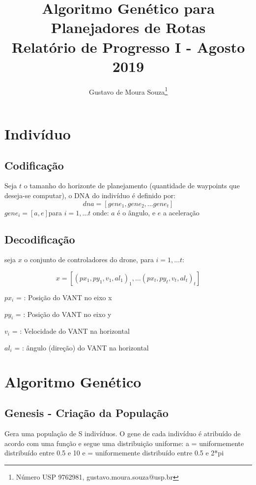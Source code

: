 \documentclass{article}
\begin{document}
\title{Algoritmo Genético para Planejadores de Rotas \\
	\large Relatório de Progresso I - Agosto 2019}
\author{Gustavo de Moura Souza\thanks{Número USP 9762981, gustavo.moura.souza@usp.br}}

\maketitle

\section{Indivíduo}
\subsection{Codificação}
Seja \(t\) o tamanho do horizonte de planejamento (quantidade de waypoints que deseja-se computar), o DNA do indivíduo é definido por:
\[dna = [ gene_1, gene_2, … gene_t ] \]
\(gene_i = [ a, e ]\)para \(i = 1, … t\)
onde: \(a\) é o ângulo, e \(e\) a aceleração


\subsection{Decodificação}
seja \(x\) o conjunto de controladores do drone, para \(i = 1, … t\):

\[x = [ (px_1, py_1, v_1, al_1)_1, … (px_t, py_t, v_t, al_t)_t]\]


\(px_i\) = : Posição do VANT no eixo x
 
\(py_i\) = : Posição do VANT no eixo y

\(v_i\)  = : Velocidade do VANT na horizontal

\(al_i\) = : ângulo (direção) do VANT na horizontal



\section{Algoritmo Genético}
\subsection{Genesis - Criação da População}
Gera uma população de S indivíduos. O gene de cada indivíduo é atribuído de acordo com uma função e segue uma distribuição uniforme:
a = uniformemente distribuído entre 0.5 e 10
e = uniformemente distribuído entre 0.5 e 2*pi
\end{document}
